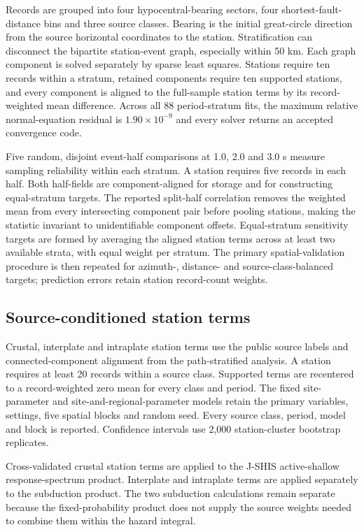 \documentclass[10pt]{article}
\begin{document}
Records are grouped into four hypocentral-bearing sectors, four shortest-fault-distance bins and three source classes. Bearing is the initial great-circle direction from the source horizontal coordinates to the station. Stratification can disconnect the bipartite station-event graph, especially within 50 km. Each graph component is solved separately by sparse least squares. Stations require ten records within a stratum, retained components require ten supported stations, and every component is aligned to the full-sample station terms by its record-weighted mean difference. Across all 88 period-stratum fits, the maximum relative normal-equation residual is $1.90\times10^{-9}$ and every solver returns an accepted convergence code.

Five random, disjoint event-half comparisons at 1.0, 2.0 and 3.0 s measure sampling reliability within each stratum. A station requires five records in each half. Both half-fields are component-aligned for storage and for constructing equal-stratum targets. The reported split-half correlation removes the weighted mean from every intersecting component pair before pooling stations, making the statistic invariant to unidentifiable component offsets. Equal-stratum sensitivity targets are formed by averaging the aligned station terms across at least two available strata, with equal weight per stratum. The primary spatial-validation procedure is then repeated for azimuth-, distance- and source-class-balanced targets; prediction errors retain station record-count weights.

\subsection*{Source-conditioned station terms}

Crustal, interplate and intraplate station terms use the public source labels and connected-component alignment from the path-stratified analysis. A station requires at least 20 records within a source class. Supported terms are recentered to a record-weighted zero mean for every class and period. The fixed site-parameter and site-and-regional-parameter models retain the primary variables, settings, five spatial blocks and random seed. Every source class, period, model and block is reported. Confidence intervals use 2,000 station-cluster bootstrap replicates.

Cross-validated crustal station terms are applied to the J-SHIS active-shallow response-spectrum product. Interplate and intraplate terms are applied separately to the subduction product. The two subduction calculations remain separate because the fixed-probability product does not supply the source weights needed to combine them within the hazard integral.
\end{document}
